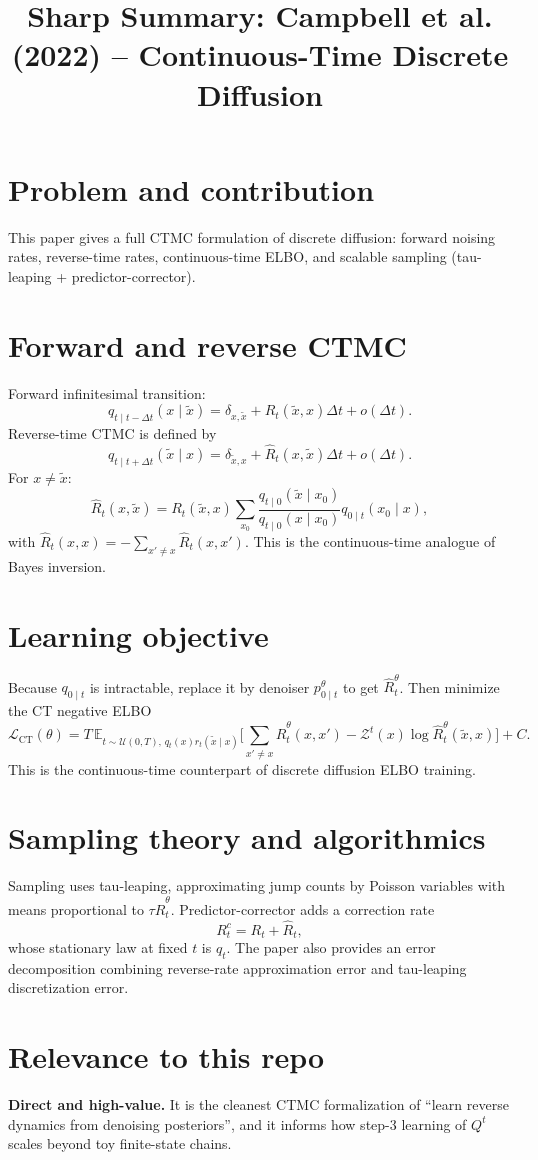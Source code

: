 \documentclass[11pt]{article}
\title{Sharp Summary: Campbell et al. (2022) -- Continuous-Time Discrete Diffusion}
\author{}
\date{}
\begin{document}
\maketitle

\section*{Problem and contribution}
This paper gives a full CTMC formulation of discrete diffusion: forward noising rates, reverse-time rates, continuous-time ELBO, and scalable sampling (tau-leaping + predictor-corrector).

\section*{Forward and reverse CTMC}
Forward infinitesimal transition:
\[
q_{t\mid t-\Delta t}(x\mid \tilde x)=\delta_{x,\tilde x}+R_t(\tilde x,x)\Delta t+o(\Delta t).
\]
Reverse-time CTMC is defined by
\[
q_{t\mid t+\Delta t}(\tilde x\mid x)=\delta_{\tilde x,x}+\hat R_t(x,\tilde x)\Delta t+o(\Delta t).
\]
For $x\neq \tilde x$:
\[
\hat R_t(x,\tilde x)
=R_t(\tilde x,x)
\sum_{x_0}
\frac{q_{t\mid 0}(\tilde x\mid x_0)}{q_{t\mid 0}(x\mid x_0)}
q_{0\mid t}(x_0\mid x),
\]
with $\hat R_t(x,x)=-\sum_{x'\neq x}\hat R_t(x,x')$.
This is the continuous-time analogue of Bayes inversion.

\section*{Learning objective}
Because $q_{0\mid t}$ is intractable, replace it by denoiser $p^\theta_{0\mid t}$ to get $\hat R_t^\theta$.
Then minimize the CT negative ELBO
\[
\mathcal L_{\mathrm{CT}}(\theta)
= T\,\mathbb E_{t\sim\mathcal U(0,T),\,q_t(x)r_t(\tilde x\mid x)}
\Big[
\sum_{x'\neq x}\hat R_t^\theta(x,x')
-\mathcal Z^t(x)\log \hat R_t^\theta(\tilde x,x)
\Big]+C.
\]
This is the continuous-time counterpart of discrete diffusion ELBO training.

\section*{Sampling theory and algorithmics}
Sampling uses tau-leaping, approximating jump counts by Poisson variables with means proportional to $\tau\hat R_t^\theta$.
Predictor-corrector adds a correction rate
\[
R_t^c = R_t + \hat R_t,
\]
whose stationary law at fixed $t$ is $q_t$.
The paper also provides an error decomposition combining reverse-rate approximation error and tau-leaping discretization error.

\section*{Relevance to this repo}
\textbf{Direct and high-value.}
It is the cleanest CTMC formalization of ``learn reverse dynamics from denoising posteriors'', and it informs how step-3 learning of $Q^t$ scales beyond toy finite-state chains.
\end{document}
